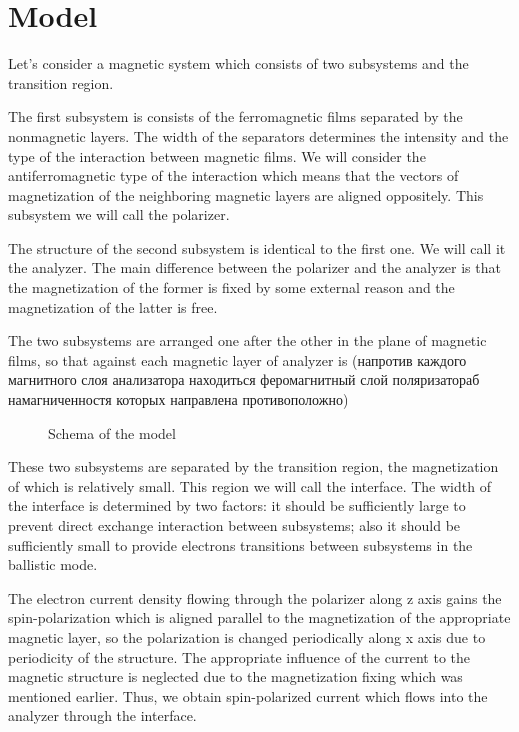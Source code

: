 \newpage

\section{Model}
\label{sec:Model}

Let's consider a magnetic system which consists of two subsystems and the transition region.

The first subsystem is consists of the ferromagnetic films separated by the nonmagnetic layers. The width of the separators determines the intensity and the type of the interaction between magnetic films. We will consider the antiferromagnetic type of the interaction which means that the vectors of magnetization of the neighboring magnetic layers are aligned oppositely. This subsystem we will call the polarizer.

The structure of the second subsystem is identical to the first one. We will call it the analyzer. The main difference between the polarizer and the analyzer is that the magnetization of the former is fixed by some external reason and the magnetization of the latter is free.

The two subsystems are arranged one after the other in the plane of magnetic films, so that against each magnetic layer of analyzer is  (напротив каждого магнитного слоя анализатора находиться феромагнитный слой поляризатораб намагниченностя которых направлена противоположно)

\begin{figure}[h]
	\centering
	
	\caption{Schema of the model}
	\label{fig:model}
\end{figure}

These two subsystems are separated by the transition region, the magnetization of which is relatively small. This region we will call the interface. The width of the interface is determined by two factors: it should be sufficiently large to prevent direct exchange interaction between subsystems; also it should be sufficiently small to provide electrons transitions between subsystems in the ballistic mode.

The electron current density flowing through the polarizer along z axis gains the spin-polarization which is aligned parallel to the magnetization of the appropriate magnetic layer, so the polarization is changed periodically along x axis due to periodicity of the structure. The appropriate influence of the current to the magnetic structure is neglected due to the magnetization fixing which was mentioned earlier. Thus, we obtain spin-polarized current which flows into the analyzer through the interface.


